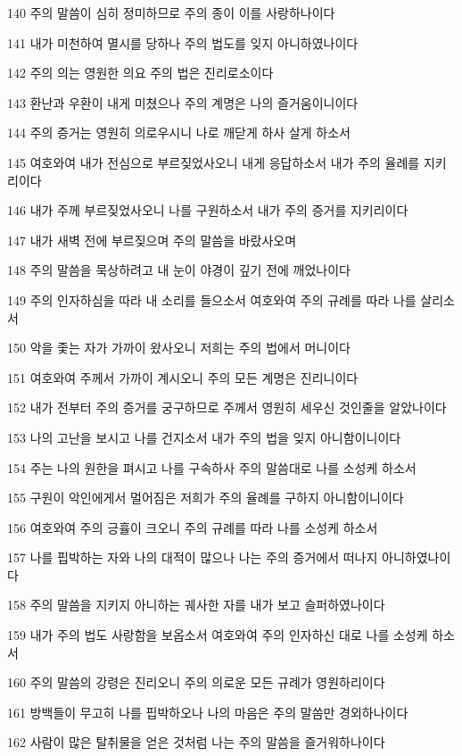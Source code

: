 \par 140 주의 말씀이 심히 정미하므로 주의 종이 이를 사랑하나이다
\par 141 내가 미천하여 멸시를 당하나 주의 법도를 잊지 아니하였나이다
\par 142 주의 의는 영원한 의요 주의 법은 진리로소이다
\par 143 환난과 우환이 내게 미쳤으나 주의 계명은 나의 즐거움이니이다
\par 144 주의 증거는 영원히 의로우시니 나로 깨닫게 하사 살게 하소서
\par 145 여호와여 내가 전심으로 부르짖었사오니 내게 응답하소서 내가 주의 율례를 지키리이다
\par 146 내가 주께 부르짖었사오니 나를 구원하소서 내가 주의 증거를 지키리이다
\par 147 내가 새벽 전에 부르짖으며 주의 말씀을 바랐사오며
\par 148 주의 말씀을 묵상하려고 내 눈이 야경이 깊기 전에 깨었나이다
\par 149 주의 인자하심을 따라 내 소리를 들으소서 여호와여 주의 규례를 따라 나를 살리소서
\par 150 악을 좇는 자가 가까이 왔사오니 저희는 주의 법에서 머니이다
\par 151 여호와여 주께서 가까이 계시오니 주의 모든 계명은 진리니이다
\par 152 내가 전부터 주의 증거를 궁구하므로 주께서 영원히 세우신 것인줄을 알았나이다
\par 153 나의 고난을 보시고 나를 건지소서 내가 주의 법을 잊지 아니함이니이다
\par 154 주는 나의 원한을 펴시고 나를 구속하사 주의 말씀대로 나를 소성케 하소서
\par 155 구원이 악인에게서 멀어짐은 저희가 주의 율례를 구하지 아니함이니이다
\par 156 여호와여 주의 긍휼이 크오니 주의 규례를 따라 나를 소성케 하소서
\par 157 나를 핍박하는 자와 나의 대적이 많으나 나는 주의 증거에서 떠나지 아니하였나이다
\par 158 주의 말씀을 지키지 아니하는 궤사한 자를 내가 보고 슬퍼하였나이다
\par 159 내가 주의 법도 사랑함을 보옵소서 여호와여 주의 인자하신 대로 나를 소성케 하소서
\par 160 주의 말씀의 강령은 진리오니 주의 의로운 모든 규례가 영원하리이다
\par 161 방백들이 무고히 나를 핍박하오나 나의 마음은 주의 말씀만 경외하나이다
\par 162 사람이 많은 탈취물을 얻은 것처럼 나는 주의 말씀을 즐거워하나이다
